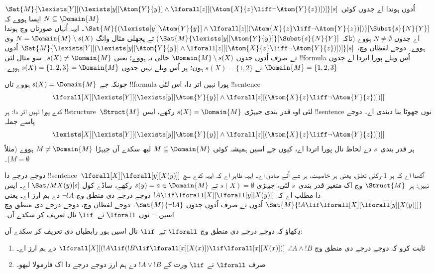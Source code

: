 \documentclass[../../../include/open-logic-section]{subfiles}
\begin{document}
\begin{ex}
  $\Sat{M}{\lexists[Y][(\lexists[y][\Atom{Y}{y}] \land
  \lforall[z][(\Atom{X}{z} \liff \lnot \Atom{Y}{z})])]}[s]$
  اُدوں ہوندا اے جدوں کوئی $N \subseteq \Domain{M}$
  ایسا ہووے کہ
  $\Sat{M}{(\lexists[y][\Atom{Y}{y}] \land \lforall[z][(\Atom{X}{z}
  \liff \lnot \Atom{Y}{z})])}[\Subst{s}{N}{Y}]$۔
  ایہہ اُنہاں صورتاں وچ ہوندا اے جدوں
  $N \neq \emptyset$ ہووے (تاکہ
  $\Sat{M}{\lexists[y][\Atom{Y}{y}]}[\Subst{s}{N}{Y}]$)
  تے پچھلی مثال وانگ
  $N = \Domain{M} \setminus s(X)$ وی ہووے۔
  دوجے لفظاں وچ،
  $\Sat{M}{\lexists[Y][(\lexists[y][\Atom{Y}{y}] \land
  \lforall[z][(\Atom{X}{z} \liff \lnot \Atom{Y}{z})])]}[s]$
  اُدوں تے صرف اُدوں جدوں
  $\Domain{M} \setminus s(X)$ خالی نہ ہووے؛ یعنی
  $s(X) \neq \Domain{M}$۔ سو مثال لئی !!{formula}
  اُس ویلے پورا اتردا اے جدوں $\Domain{M}
  = \{1, 2, 3\}$ تے $s(X) = \{1, 2\}$ ہون؛
  پر اُس ویلے نہیں جدوں $s(X) = \{1, 2, 3\}
  = \Domain{M}$ ہووے۔

  چونکہ جے $s(X) = \Domain{M}$ ہووے تاں
  !!{formula} پورا نہیں اتر دا، اس لئی
  !!{sentence}
  \[
  \lforall[X][\lexists[Y][(\lexists[y][\Atom{Y}{y}] \land
      \lforall[z][(\Atom{X}{z} \liff \lnot \Atom{Y}{z})])]]
  \]
  کدے پورا نہیں اتر دا: ہر !!{structure}~$\Struct{M}$
  لئی اوہ قدر بندی جیہڑی
  $s(X) = \Domain{M}$ رکھے، ایس !!{sentence}
  نوں جھوٹا بنا دیندی اے۔ دوجے پاسے جملہ
  \[
  \lexists[X][\lexists[Y][(\lexists[y][\Atom{Y}{y}] \land
      \lforall[z][(\Atom{X}{z} \liff \lnot \Atom{Y}{z})])]]
  \]
  ہر قدر بندی~$s$ دے لحاظ نال پورا اتردا اے،
  کیوں جے اسیں ہمیشہ کوئی $M \subseteq \Domain{M}$
  لبھ سکدے آں جیہڑا $M \neq \Domain{M}$ ہووے
  (مثلاً $M = \emptyset$)۔
\end{ex}

\begin{ex}
  دوجے درجے دا !!{sentence}~$\lforall[X][\lforall[y][X(y)]]$
  آکھدا اے کہ ہر $1$-رکنی تعلق، یعنی ہر خاصیت،
  ہر شے اُتے صادق اے۔ ایہہ ظاہر اے کہ ایہہ کدے
  سچ نہیں: ہر~$\Struct{M}$ وچ اک متغیر قدر بندی~$s$
  لئی، جیہڑی $s(X) = \emptyset$ تے
  $s(y) = a \in \Domain{M}$ رکھے، ساڈے کول
  $\Sat/{M}{X(y)}[s]$ اے۔ ایس دا مطلب اے کہ
  $!A \lif \lforall[X][\lforall[y][X(y)]]$
  دوجے درجے دی منطق وچ $\lnot !A$ دے ہم ارز اے۔
  یعنی $\Sat{M}{!A \lif
  \lforall[X][\lforall[y][X(y)]]}$ اُدوں تے صرف
  اُدوں جدوں $\Sat{M}{\lnot !A}$۔
  دوجے لفظاں وچ، دوجے درجے دی منطق وچ اسیں
  $\lnot$ نوں $\lforall$ تے~$\lif$ نال
  تعریف کر سکدے آں۔
\end{ex}

\begin{prob}
  دِکھاؤ کہ دوجے درجے دی منطق وچ $\lforall$
  تے~$\lif$ نال اسیں ہور رابطیاں دی تعریف کر سکدے آں:
  \begin{enumerate}
    \item ثابت کرو کہ دوجے درجے دی منطق وچ
    $!A \land !B$،
    $\lforall[X][(!A \lif (!B \lif \lforall[x][X(x)])\lif
    \lforall[x][X(x)])]$ دے ہم ارز اے۔
    \item صرف $\lforall$ تے $\lif$ ورت کے
    $!A \lor !B$ دے ہم ارز دوجے درجے دا
    اک فارمولا لبھو۔
  \end{enumerate}
\end{prob}
\end{document}
